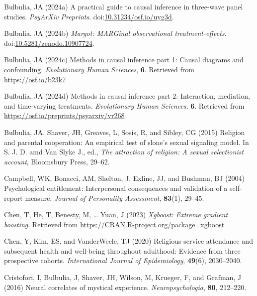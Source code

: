 \documentclass[
  single column]{article}
\newlength{\cslhangindent}
\newenvironment{CSLReferences}[2] %
 {\begin{list}{}{%
  \setlength{\itemindent}{0pt}
  \setlength{\leftmargin}{0pt}
  \setlength{\parsep}{0pt}
  \ifodd #1
   \setlength{\leftmargin}{\cslhangindent}
   \setlength{\itemindent}{-1\cslhangindent}
  \fi
  \setlength{\itemsep}{#2\baselineskip}}}
 {\end{list}}
\begin{document}
\begin{CSLReferences}{1}{0}
Bulbulia, JA (2024a) A practical guide to causal inference in three-wave
panel studies. \emph{PsyArXiv Preprints}.
doi:\href{https://doi.org/10.31234/osf.io/uyg3d}{10.31234/osf.io/uyg3d}.

Bulbulia, JA (2024b) \emph{Margot: MARGinal observational
treatment-effects}.
doi:\href{https://doi.org/10.5281/zenodo.10907724}{10.5281/zenodo.10907724}.

Bulbulia, JA (2024c) Methods in causal inference part 1: Causal diagrams
and confounding. \emph{Evolutionary Human Sciences}, \textbf{6}.
Retrieved from \url{https://osf.io/b23k7}

Bulbulia, JA (2024d) Methods in causal inference part 2: Interaction,
mediation, and time-varying treatments. \emph{Evolutionary Human
Sciences}, \textbf{6}. Retrieved from
\url{https://osf.io/preprints/psyarxiv/vr268}

Bulbulia, JA, Shaver, JH, Greaves, L, Sosis, R, and Sibley, CG (2015)
Religion and parental cooperation: An empirical test of slone's sexual
signaling model. In S. J. D. amd Van Slyke J., ed., \emph{The attraction
of religion: A sexual selectionist account}, Bloomsbury Press, 29--62.

Campbell, WK, Bonacci, AM, Shelton, J, Exline, JJ, and Bushman, BJ
(2004) Psychological entitlement: Interpersonal consequences and
validation of a self-report measure. \emph{Journal of Personality
Assessment}, \textbf{83}(1), 29--45.

Chen, T, He, T, Benesty, M, \ldots{} Yuan, J (2023) \emph{Xgboost:
Extreme gradient boosting}. Retrieved from
\url{https://CRAN.R-project.org/package=xgboost}

Chen, Y, Kim, ES, and VanderWeele, TJ (2020) Religious-service
attendance and subsequent health and well-being throughout adulthood:
Evidence from three prospective cohorts. \emph{International Journal of
Epidemiology}, \textbf{49}(6), 2030--2040.

Cristofori, I, Bulbulia, J, Shaver, JH, Wilson, M, Krueger, F, and
Grafman, J (2016) Neural correlates of mystical experience.
\emph{Neuropsychologia}, \textbf{80}, 212--220.


\end{CSLReferences}
\end{document}
